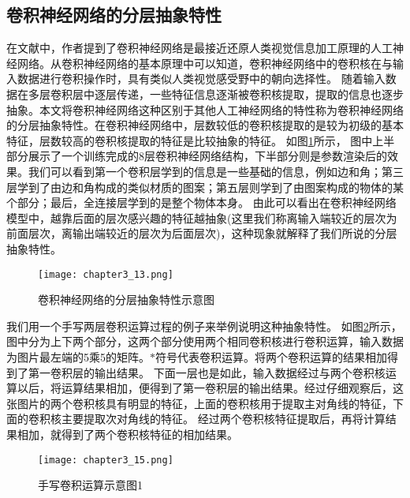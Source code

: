 \subsection{卷积神经网络的分层抽象特性}
在文献\cite{2019arXiv190906161K}中，作者提到了卷积神经网络是最接近还原人类视觉信息加工原理的人工神经网络。从卷积神经网络的基本原理中可以知道，卷积神经网络中的卷积核在与输入数据进行卷积操作时，具有类似人类视觉感受野中的朝向选择性。
随着输入数据在多层卷积层中逐层传递，一些特征信息逐渐被卷积核提取，提取的信息也逐步抽象。本文将卷积神经网络这种区别于其他人工神经网络的特性称为卷积神经网络的分层抽象特性。在卷积神经网络中，层数较低的卷积核提取的是较为初级的基本特征，层数较高的卷积核提取的特征是比较抽象的特征。
如图\ref{fig:chapter3_13}所示， 图中上半部分展示了一个训练完成的8层卷积神经网络结构，下半部分则是参数渲染后的效果。我们可以看到第一个卷积层学到的信息是一些基础的信息，例如边和角；第三层学到了由边和角构成的类似材质的图案；第五层则学到了由图案构成的物体的某个部分；最后，全连接层学到的是整个物体本身。
由此可以看出在卷积神经网络模型中，越靠后面的层次感兴趣的特征越抽象(这里我们称离输入端较近的层次为前面层次，离输出端较近的层次为后面层次)，这种现象就解释了我们所说的分层抽象特性。
\begin{figure}
    \centering
    \texttt{[image: chapter3\_13.png]}
    \caption{卷积神经网络的分层抽象特性示意图\cite{luyujie2018}}
    \label{fig:chapter3_13}
\end{figure}


我们用一个手写两层卷积运算过程的例子来举例说明这种抽象特性。
如图\ref{fig:chapter3_15}所示，图中分为上下两个部分，这两个部分使用两个相同卷积核进行卷积运算，输入数据为图片最左端的5乘5的矩阵。$\ast$符号代表卷积运算。将两个卷积运算的结果相加得到了第一卷积层的输出结果。
下面一层也是如此，输入数据经过与两个卷积核运算以后，将运算结果相加，便得到了第一卷积层的输出结果。经过仔细观察后，这张图片的两个卷积核具有明显的特征，上面的卷积核用于提取主对角线的特征，下面的卷积核主要提取次对角线的特征。
经过两个卷积核特征提取后，再将计算结果相加，就得到了两个卷积核特征的相加结果。
\begin{figure}
    \centering
    \texttt{[image: chapter3\_15.png]}
    \caption{手写卷积运算示意图1}
    \label{fig:chapter3_15}
\end{figure}

